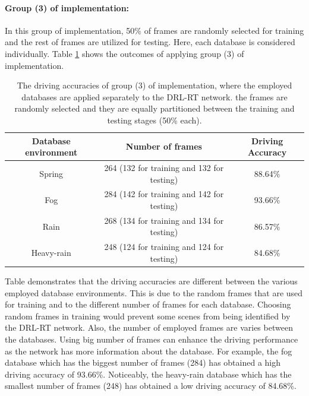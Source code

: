 \documentclass{svproc}
\begin{document}
	\paragraph{\textbf{Group (3) of implementation:}} 
		In this group of implementation, 50\% of frames  are randomly selected for training and the rest of frames are utilized for testing. Here, each database is considered individually. Table \ref{Table:Group(3)} shows the outcomes of applying group (3) of implementation.
		
		\begin{table}[!h]
			\centering
			\begin{tabular}{|c|c|c|}
				\hline
				\textbf{Database environment} & \textbf{Number of frames} & \textbf{Driving Accuracy} \\ \hline
				Spring & 264 (132 for training and 132 for testing) & 88.64\% \\ \hline
				Fog & 284 (142 for training and  142  for testing) & 93.66\% \\ \hline
				Rain & 268 (134 for training and 134 for testing) & 86.57\% \\ \hline
				Heavy-rain & 248 (124 for training and 124 for testing) & 84.68\% \\ \hline
			\end{tabular}	
			\caption{The driving accuracies of group (3) of implementation, where the employed databases are applied separately to the DRL-RT network. the frames are randomly selected and they are equally partitioned between the training and testing stages (50\% each).}
			\label{Table:Group(3)} 
		\end{table}

		Table \label{Table:Group(3)} demonstrates that the driving accuracies are different between the various employed database environments. This is due to the random frames that are used for training and to the different number of frames for each database. Choosing random frames in training would prevent some scenes from being identified by the DRL-RT network. Also, the number of employed frames are varies between the databases. Using big number of frames can enhance the driving performance as the network has more information about the database. For example, the fog database which has the biggest number of frames (284) has obtained a high driving accuracy of 93.66\%. Noticeably, the heavy-rain database which has the smallest number of frames (248) has obtained a low driving accuracy of 84.68\%. 
		
\end{document}
